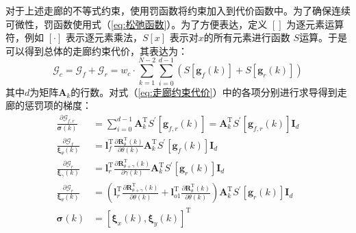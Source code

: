 \documentclass[master,academic]{ysuthesis} %
\begin{document}
		对于上述走廊的不等式约束，使用罚函数将约束加入到代价函数中。为了确保连续可微性，罚函数使用式（\ref{eq:松弛函数}）。为了方便表达，定义 \([]\) 为逐元素运算符，例如 \([\cdot]\) 表示逐元素乘法，\(S[x]\) 表示对$x$的所有元素进行函数 \(S\)运算。于是可以得到总体的走廊约束代价，其表达为：
		\begin{equation}
			\mathcal{G}_c =\mathcal{G}_{f}+\mathcal{G}_{r}=w_{c}\cdot \sum_{k=1}^{N-2}\sum_{i=0}^{d-1}(S[\bm{g}_{f}(k)] + S[\bm{g}_{r}(k)])\label{eq:走廊约束代价}
		\end{equation}
		其中$d$为矩阵$\bm{A}_k$的行数。对式（\ref{eq:走廊约束代价}）中的各项分别进行求导得到走廊的惩罚项的梯度：
		\begin{equation}
			\begin{aligned}
				\frac{\partial \mathcal{G}_{f,r}}{\bm{\sigma} \left( k \right)}&=\sum_{i=0}^{d-1}{\bm{A}}_{k}^{\mathrm{T}}S^{'}\left[ \bm{g}_{f,r}\left( k \right) \right] =\bm{A}_{k}^{\mathrm{T}}S^{'}\left[ \bm{g}_{f,r}\left( k \right) \right] \bm{I}_d\\
				\frac{\partial \mathcal{G}_f}{\bm{\xi} _{\theta}\left( k \right)}&=\bm{l}_{f}^{\mathrm{T}}\frac{\partial \bm{R}_{\theta}^{\mathrm{T}}\left( k \right)}{\partial \theta \left( k \right)}\bm{A}_{k}^{\mathrm{T}}S^{'}\left[ \bm{g}_{f}\left( k \right) \right] \bm{I}_d\\
				\frac{\partial \mathcal{G}_r}{\bm{\xi} _{\gamma}\left( k \right)}&=\bm{l}_{r}^{\mathrm{T}}\frac{\partial \bm{R}_{\theta +\gamma}^{\mathrm{T}}\left( k \right)}{\partial \gamma \left( k \right)}\bm{A}_{k}^{\mathrm{T}}S^{'}\left[ \bm{g}_{r}\left( k \right) \right] \bm{I}_d\\
				\frac{\partial \mathcal{G}_r}{\bm{\xi} _{\theta}\left( k \right)}&=\left( \bm{l}_{r}^{\mathrm{T}}\frac{\partial \bm{R}_{\theta +\gamma}^{\mathrm{T}}\left( k \right)}{\partial \theta \left( k \right)}+\bm{l}_{o1}^{\mathrm{T}}\frac{\partial \bm{R}_{\theta}^{\mathrm{T}}\left( k \right)}{\partial \theta \left( k \right)} \right) \bm{A}_{k}^{\mathrm{T}}S^{'}\left[ \bm{g}_{r}\left( k \right) \right] \bm{I}_d\\
				\bm{\sigma} \left( k \right) &=\left[ \bm{\xi} _x\left( k \right) ,\bm{\xi} _y\left( k \right) \right] ^{\mathrm{T}}
			\end{aligned}
		\end{equation}
		
\end{document}
